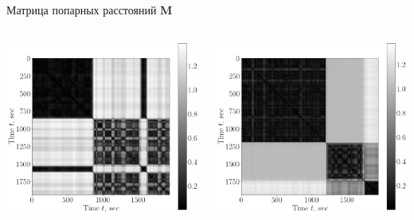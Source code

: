 \documentclass[10pt,pdf,hyperref={unicode}]{beamer}
\begin{document}
\begin{frame}[shrink=5]{Матрица попарных расстояний $\textbf{M}$}

\begin{columns}
    \begin{column}{0.35\textwidth}
        \includegraphics[width=1\textwidth]{results/2_patern_2_full}
    \end{column}
    \begin{column}{0.35\textwidth}
        \includegraphics[width=1\textwidth]{results/3_patern_2_full}
    \end{column}
\end{columns}


\end{frame}
\end{document}
